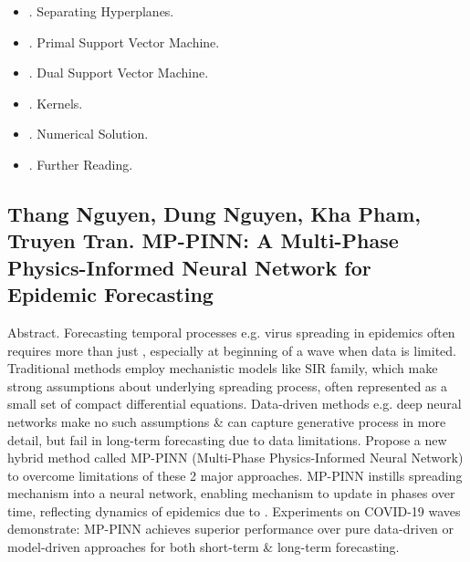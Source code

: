 \documentclass{article}
\begin{document}
\begin{enumerate}
\begin{itemize}
		\begin{itemize}
			\item {. Separating Hyperplanes.}
			\item {. Primal Support Vector Machine.}
			\item {. Dual Support Vector Machine.}
			\item {. Kernels.}
			\item {. Numerical Solution.}
			\item {. Further Reading.}
		\end{itemize}
	\end{itemize}
\end{enumerate}


\subsection{{\sc Thang Nguyen, Dung Nguyen, Kha Pham, Truyen Tran}. MP-PINN: A Multi-Phase Physics-Informed Neural Network for Epidemic Forecasting}
{\sf Abstract.} Forecasting temporal processes e.g. virus spreading in epidemics often requires more than just , especially at beginning of a wave when data is limited. Traditional methods employ mechanistic models like SIR family, which make strong assumptions about underlying spreading process, often represented as a small set of compact differential equations. Data-driven methods e.g. deep neural networks make no such assumptions \& can capture generative process in more detail, but fail in long-term forecasting due to data limitations. Propose a new hybrid method called MP-PINN (Multi-Phase Physics-Informed Neural Network) to overcome limitations of these 2 major approaches. MP-PINN instills spreading mechanism into a neural network, enabling mechanism to update in phases over time, reflecting dynamics of epidemics due to . Experiments on COVID-19 waves demonstrate: MP-PINN achieves superior performance over pure data-driven or model-driven approaches for both short-term \& long-term forecasting.
\end{document}
